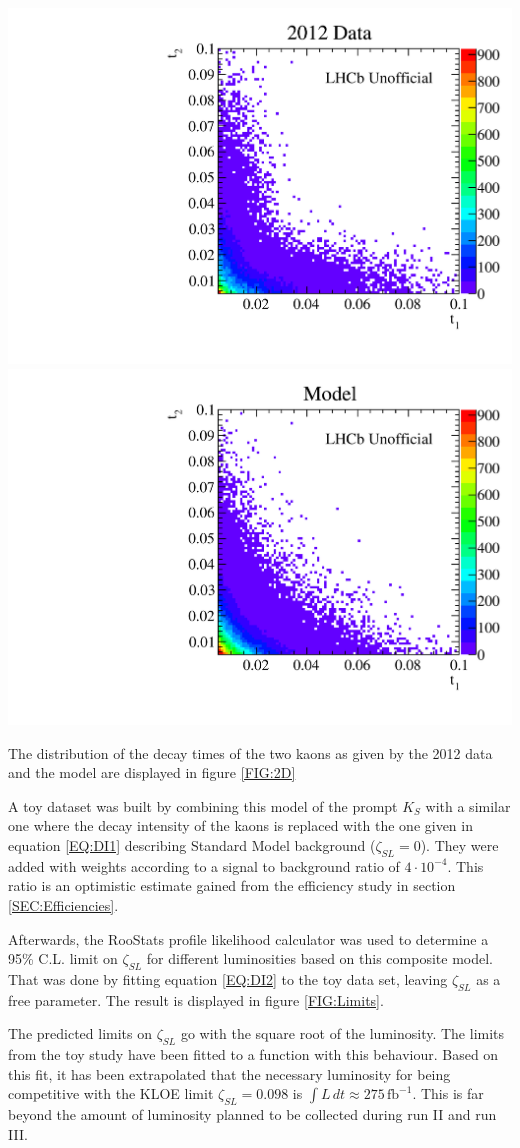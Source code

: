 \begin{center}
\includegraphics[width =.49\textwidth]{figs/data.pdf}
\includegraphics[width =.49\textwidth]{figs/model.pdf}
\label{FIG:2D}
\end{center}

The distribution of the decay times of the two kaons as given by the 2012 data and the model are displayed in figure \ref{FIG:2D}




A toy dataset was built by combining this model of the prompt $K_S$ with a similar one where the decay intensity of the kaons is replaced with the one given in equation \eqref{EQ:DI1} describing Standard Model background ($\zeta_{SL}=0$). They were added with weights according to a signal to background ratio of $4\cdot10^{-4}$. This ratio is an optimistic estimate gained from the efficiency study in section  \ref{SEC:Efficiencies}.



Afterwards, the RooStats profile likelihood calculator was used to determine a 95\% C.L. limit on $\zeta_{SL}$ for different luminosities based on this composite model. That was done by fitting equation \eqref{EQ:DI2} to the toy data set, leaving $\zeta_{SL}$ as a free parameter. The result is displayed in figure \ref{FIG:Limits}.

The predicted limits on $\zeta_{SL}$ go with the square root of the luminosity. The limits from the toy study have been fitted to a function with this behaviour. Based on this fit, it has been extrapolated that the necessary luminosity for being competitive with the KLOE limit $\zeta_{SL} = 0.098$ is $\int L\,dt \approx 275\,\text{fb}^{-1}$. This is far beyond the amount of luminosity planned to be collected during run II and run III.

